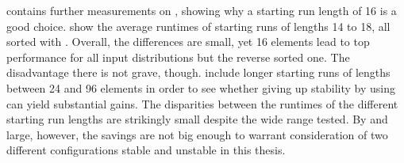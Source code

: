  contains further measurements on \MS{}, showing why a starting run length of 16 is a good choice.
 show the average runtimes of starting runs of lengths 14 to 18, all sorted with \IS{}.
Overall, the differences are small, yet 16 elements lead to top performance for all input distributions but the reverse sorted one.
The disadvantage there is not grave, though.
 include longer starting runs of lengths between 24 and 96 elements in order to see whether giving up stability by using \ShS{} can yield substantial gains.
The disparities between the runtimes of the different starting run lengths are strikingly small despite the wide range tested.
By and large, however, the savings are not big enough to warrant consideration of two different \MS{} configurations \Dash stable and unstable \Dash in this thesis.
